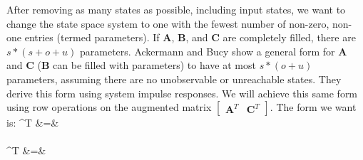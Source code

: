 After removing as many states as possible, including input states, we
want to change the state space system to one with the fewest number of
non-zero, non-one entries (termed parameters). If $\mathbf{A}$,
$\mathbf{B}$, and $\mathbf{C}$ are completely filled, there are
$s*(s+o+u)$ parameters. Ackermann and Bucy
\cite{Ackermann/Bucy} show a general form for $\mathbf{A}$ and
$\mathbf{C}$ ($\mathbf{B}$ can be filled with parameters) to have
at most $s*(o+u)$ parameters, assuming there are no unobservable
or unreachable states. They derive this form using system impulse
responses. We will achieve this same form using row operations on
the augmented matrix $\left [
\begin{array} {cc} \mathbf{A}^T & \mathbf{C}^T \end{array} \right
]$. The form we want is:
\starteqnstar
{}^T &=&  \\ ~ \\
^T &=& 
\doneeqnstar

